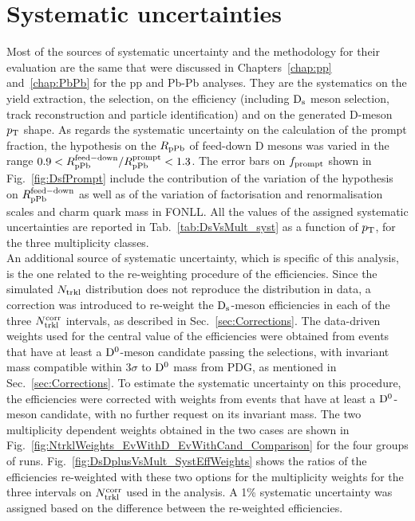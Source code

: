 \section {Systematic uncertainties}
\label{sec:systpA}
Most of the sources of systematic uncertainty and the methodology for their evaluation are the same
that were discussed in Chapters~\ref{chap:pp} and~\ref{chap:PbPb} for
the pp and Pb-Pb analyses. They are the systematics on the yield extraction, 
the selection, on the efficiency (including ${\rm D_s}$ meson selection, track reconstruction and particle
identification) and on the generated D-meson $p_{\rm T}$ shape.
As regards the systematic uncertainty on the calculation of the prompt 
fraction, the hypothesis on the $R_{\rm pPb}$ of feed-down D mesons 
was varied in the range $0.9 <R_{\rm pPb}^{\rm feed-down}/R_{\rm pPb}^{\rm prompt} < 1.3$.
The error bars on $f_{\rm prompt}$ shown in Fig.~\ref{fig:DsfPrompt} include the
contribution of the variation of the hypothesis on $R_{\rm pPb}^{\rm feed-down}$ 
as well as of the variation of factorisation and renormalisation scales and charm quark mass in FONLL. 
All the values of the assigned systematic uncertainties are reported
in Tab.~\ref{tab:DsVsMult_syst} as a function of $p_{\rm T}$, for the 
three multiplicity classes. \\


An additional source of systematic uncertainty, which is specific of this analysis, is the one related to 
the re-weighting procedure of the efficiencies.  
Since the simulated $N_{\rm trkl}$ distribution does not reproduce the distribution in data, 
a correction was introduced to re-weight the ${\rm D_s}$-meson efficiencies in each of the three $N_{\rm trkl}^{\rm corr}$ intervals, as described 
in Sec.~\ref{sec:Corrections}. 
The data-driven weights used for the central value of the efficiencies were obtained from
events that have at least a ${\rm D^0}$-meson candidate
passing the selections, with invariant mass compatible within 3$\sigma$ to ${\rm D^0}$ mass from PDG, as mentioned 
in Sec.~\ref{sec:Corrections}.
To estimate the systematic uncertainty on this procedure,
the efficiencies were corrected with weights from events that have at 
least a ${\rm D^0}$-meson candidate, with no further request on its invariant mass. 
The two multiplicity dependent weights obtained in the two cases are shown in 
Fig.~\ref{fig:NtrklWeights_EvWithD_EvWithCand_Comparison} for the four groups of runs. 
Fig.~\ref{fig:DsDplusVsMult_SystEffWeights} shows the ratios of the efficiencies re-weighted 
with these two options for the multiplicity weights for the three intervals on $N_{\rm trkl}^{\rm corr}$ used
in the analysis. A 1\% systematic uncertainty was assigned based on the difference between 
the re-weighted efficiencies.\\

